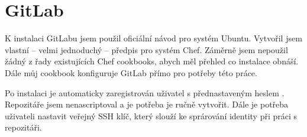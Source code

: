 
\section{GitLab}
    K instalaci GitLabu jsem použil oficiální návod pro systém Ubuntu. Vytvořil jsem vlastní -- velmi jednoduchý -- předpis pro systém Chef. Záměrně jsem nepoužil žádný z řady existujících Chef cookbooks, abych měl přehled co instalace obnáší. Dále můj cookbook konfiguruje GitLab přímo pro potřeby této práce.

    Po instalaci je automaticky zaregistrován uživatel  s přednastaveným heslem . Repozitáře jsem nenascriptoval a je potřeba je ručně vytvořit. Dále je potřeba uživateli nastavit veřejný SSH klíč, který slouží ke sprárování identity při práci s repozitáři.

